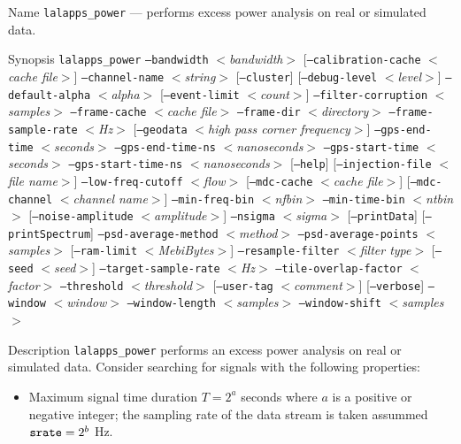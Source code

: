 \begin{entry}

\item[Name]
\texttt{lalapps\_power} --- performs excess power analysis on real or
simulated data.

\newcommand{\prog}[1]{\texttt{#1}}
\newcommand{\option}[1]{\texttt{#1}}
\newcommand{\parm}[1]{$<$\textit{#1}$>$}

\item[Synopsis]
\prog{lalapps\_power}
\option{--bandwidth} \parm{bandwidth}
[\option{--calibration-cache} \parm{cache file}]
\option{--channel-name} \parm{string}
[\option{--cluster}]
[\option{--debug-level} \parm{level}]
\option{--default-alpha} \parm{alpha}
[\option{--event-limit} \parm{count}]
\option{--filter-corruption} \parm{samples}
\option{--frame-cache} \parm{cache file}
\option{--frame-dir} \parm{directory}
\option{--frame-sample-rate} \parm{Hz}
[\option{--geodata} \parm{high pass corner frequency}]
\option{--gps-end-time} \parm{seconds}
\option{--gps-end-time-ns} \parm{nanoseconds}
\option{--gps-start-time} \parm{seconds}
\option{--gps-start-time-ns} \parm{nanoseconds}
[\option{--help}]
[\option{--injection-file} \parm{file name}]
\option{--low-freq-cutoff} \parm{flow}
[\option{--mdc-cache} \parm{cache file}]
[\option{--mdc-channel} \parm{channel name}]
\option{--min-freq-bin} \parm{nfbin}
\option{--min-time-bin} \parm{ntbin}
[\option{--noise-amplitude} \parm{amplitude}]
\option{--nsigma} \parm{sigma}
[\option{--printData}]
[\option{--printSpectrum}]
\option{--psd-average-method} \parm{method}
\option{--psd-average-points} \parm{samples}
[\option{--ram-limit} \parm{MebiBytes}]
\option{--resample-filter} \parm{filter type}
[\option{--seed} \parm{seed}]
\option{--target-sample-rate} \parm{Hz}
\option{--tile-overlap-factor} \parm{factor}
\option{--threshold} \parm{threshold}
[\option{--user-tag} \parm{comment}]
[\option{--verbose}]
\option{--window} \parm{window}
\option{--window-length} \parm{samples}
\option{--window-shift} \parm{samples}

\item[Description] 
\prog{lalapps\_power} performs an excess power analysis on real or
simulated data.  Consider searching for signals with the following
properties:
\begin{itemize}
\item Maximum signal time duration $T=2^a$ seconds where $a$ is a positive
or negative integer;  the sampling rate of the data stream is taken
assummed $\mbox{\texttt{srate}} = 2^b$ Hz.


\end{itemize}
\end{entry}
